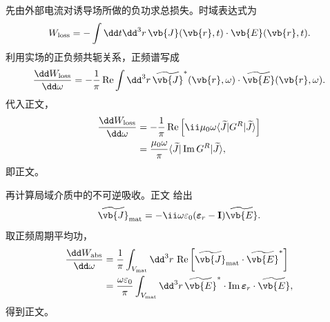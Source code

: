 \begin{derivation}

先由外部电流对诱导场所做的负功求总损失。时域表达式为
\begin{equation*}
 W_{\rm loss}
 =-\int\dd t\dd^3 r\,
 \vb{J}(\vb{r},t)\cdot\vb{E}(\vb{r},t).
\end{equation*}
利用实场的正负频共轭关系，正频谱写成
\begin{equation*}
 \frac{\dd W_{\rm loss}}{\dd\omega}
 =-\frac1\pi\operatorname{Re}
 \int\dd^3 r\,
 \widetilde{\vb{J}}^{*}(\vb{r},\omega)
 \cdot\widetilde{\vb{E}}(\vb{r},\omega).
\end{equation*}
代入正文，
\begin{align*}
 \frac{\dd W_{\rm loss}}{\dd\omega}
 &=-\frac1\pi\operatorname{Re}
 \left[\ii\mu_0\omega
 \langle\widetilde J|G^R|\widetilde J\rangle\right]\\
 &=\frac{\mu_0\omega}{\pi}
 \langle\widetilde J|\operatorname{Im}G^R|\widetilde J\rangle,
\end{align*}
即正文。

再计算局域介质中的不可逆吸收。正文 给出
\begin{equation*}
 \widetilde{\vb{J}}_{\rm mat}
 =-\ii\omega\varepsilon_0
 (\boldsymbol\varepsilon_r-\mathbf I)\widetilde{\vb{E}}.
\end{equation*}
取正频周期平均功，
\begin{align*}
 \frac{\dd W_{\rm abs}}{\dd\omega}
 &=\frac1\pi\int_{V_{\rm mat}}\dd^3 r\,
 \operatorname{Re}
 \left[\widetilde{\vb{J}}_{\rm mat}\cdot
 \widetilde{\vb{E}}^{*}\right]\\
 &=\frac{\omega\varepsilon_0}{\pi}
 \int_{V_{\rm mat}}\dd^3 r\,
 \widetilde{\vb{E}}^{*}\cdot
 \operatorname{Im}\boldsymbol\varepsilon_r
 \cdot\widetilde{\vb{E}},
\end{align*}
得到正文。


\end{derivation}
